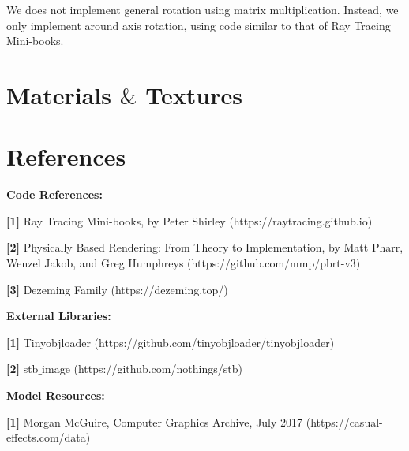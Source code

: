 \documentclass[utf8]{article}
\begin{document}
We does not implement general rotation using matrix multiplication. Instead, we only implement around axis rotation, using code similar to that of Ray Tracing Mini-books.

\section{Materials $\&$ Textures}

\section{References}
\noindent
\textbf{Code References: }

\noindent
\textbf{[1]} Ray Tracing Mini-books, by Peter Shirley (https://raytracing.github.io)

\noindent
\textbf{[2]} Physically Based Rendering: From Theory to Implementation, by Matt Pharr, Wenzel Jakob, and Greg Humphreys (https://github.com/mmp/pbrt-v3)

\noindent
\textbf{[3]} Dezeming Family (https://dezeming.top/)

\noindent
\textbf{External Libraries: }

\noindent
\textbf{[1]} Tinyobjloader (https://github.com/tinyobjloader/tinyobjloader)

\noindent
\textbf{[2]} stb$\_$image (https://github.com/nothings/stb)

\noindent
\textbf{Model Resources: }

\noindent
\textbf{[1]} Morgan McGuire, Computer Graphics Archive, July 2017 (https://casual-effects.com/data)
\end{document}
